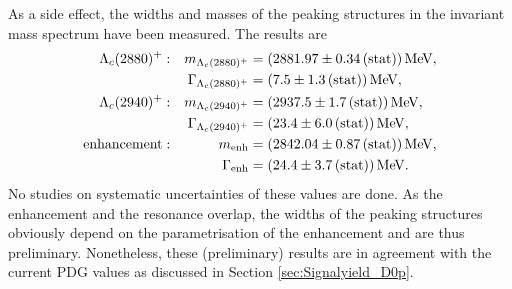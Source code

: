 As a side effect, the widths and masses of the peaking structures in the invariant \Dz\proton mass spectrum have been measured.
The results are
\begin{align*}
    {\ensuremath{\Lambda}}_{c}(2880)^+:            && m_{{\Lambda}_{c}(2880)^+}         &= (2881.97 \pm 0.34\mathrm{\,(stat)}) \mathrm{\,Me\kern -0.1em V}, \\
                        && \Gamma_{{\Lambda}_{c}(2880)^+}    &= (7.5 \pm 1.3\mathrm{\,(stat)}) \mathrm{\,Me\kern -0.1em V}, \\
    {\Lambda}_{c}(2940)^+:           && m_{{\Lambda}_{c}(2940)^+}        &= (2937.5 \pm 1.7\mathrm{\,(stat)}) \mathrm{\,Me\kern -0.1em V}, \\
                        && \Gamma_{{\Lambda}_{c}(2940)^+}   &= (23.4 \pm 6.0\mathrm{\,(stat)}) \mathrm{\,Me\kern -0.1em V}, \\
    \text{enhancement}: && m_{\text{enh}}      &= (2842.04 \pm 0.87\mathrm{\,(stat)}) \mathrm{\,Me\kern -0.1em V}, \\
                        && \Gamma_{\text{enh}} &= (24.4 \pm 3.7\mathrm{\,(stat)}) \mathrm{\,Me\kern -0.1em V}.
\end{align*}
No studies on systematic uncertainties of these values are done.
As the enhancement and the \LcResI resonance overlap, the widths of the peaking structures obviously depend on the parametrisation of the enhancement and are thus preliminary.
Nonetheless, these (preliminary) results are in agreement with the current PDG values as discussed in Section \ref{sec:Signalyield_D0p}.
